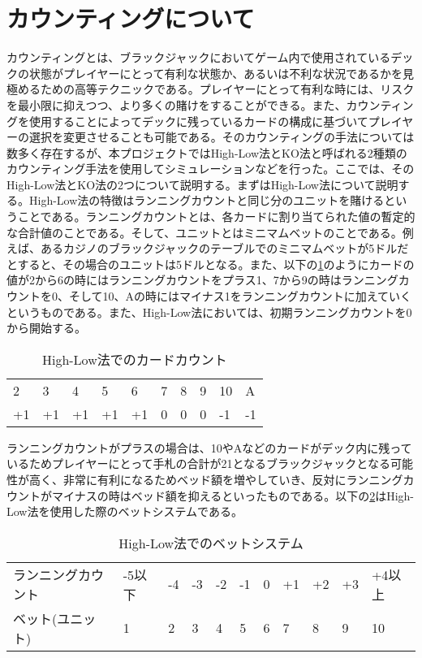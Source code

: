 \section{カウンティングについて}
カウンティングとは、ブラックジャックにおいてゲーム内で使用されているデックの状態がプレイヤーにとって有利な状態か、あるいは不利な状況であるかを見極めるための高等テクニックである。プレイヤーにとって有利な時には、リスクを最小限に抑えつつ、より多くの賭けをすることができる。また、カウンティングを使用することによってデックに残っているカードの構成に基づいてプレイヤーの選択を変更させることも可能である。そのカウンティングの手法については数多く存在するが、本プロジェクトではHigh-Low法とKO法と呼ばれる2種類のカウンティング手法を使用してシミュレーションなどを行った。ここでは、そのHigh-Low法とKO法の2つについて説明する。まずはHigh-Low法について説明する。High-Low法の特徴はランニングカウントと同じ分のユニットを賭けるということである。ランニングカウントとは、各カードに割り当てられた値の暫定的な合計値のことである。そして、ユニットとはミニマムベットのことである。例えば、あるカジノのブラックジャックのテーブルでのミニマムベットが5ドルだとすると、その場合のユニットは5ドルとなる。また、以下の\ref{hlc}のようにカードの値が2から6の時にはランニングカウントをプラス1、7から9の時はランニングカウントを0、そして10、Aの時にはマイナス1をランニングカウントに加えていくというものである。また、High-Low法においては、初期ランニングカウントを0から開始する。
\begin{table}[H]
\begin{tabular}{llllllllll}
2&3&4&5&6&7&8&9&10&A \\
+1&+1&+1&+1&+1&0&0&0&-1&-1 \\
\end{tabular}
\caption{High-Low法でのカードカウント}
\label{hlc}
\end{table}
ランニングカウントがプラスの場合は、10やAなどのカードがデック内に残っているためプレイヤーにとって手札の合計が21となるブラックジャックとなる可能性が高く、非常に有利になるためベッド額を増やしていき、反対にランニングカウントがマイナスの時はベッド額を抑えるといったものである。以下の\ref{hlb}はHigh-Low法を使用した際のベットシステムである。
\begin{table}[H]
\begin{tabular}{lllllllllll}
ランニングカウント&-5以下&-4&-3&-2&-1&0&+1&+2&+3&+4以上 \\
ベット(ユニット)&1&2&3&4&5&6&7&8&9&10 \\
\end{tabular}
\caption{High-Low法でのベットシステム}
\label{hlb}
\end{table}
